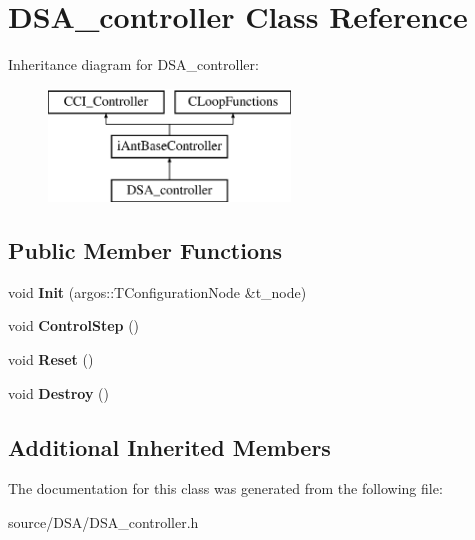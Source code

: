\hypertarget{class_d_s_a__controller}{}\section{D\+S\+A\+\_\+controller Class Reference}
\label{class_d_s_a__controller}
Inheritance diagram for D\+S\+A\+\_\+controller\+:\begin{figure}[H]
\begin{center}
\leavevmode
\includegraphics[height=3.000000cm]{class_d_s_a__controller}
\end{center}
\end{figure}
\subsection*{Public Member Functions}
\begin{DoxyCompactItemize}
\item 
\hypertarget{class_d_s_a__controller_a8891098013a4af1dcf7d5c8778387ff9}{}void {\bfseries Init} (argos\+::\+T\+Configuration\+Node \&t\+\_\+node)\label{class_d_s_a__controller_a8891098013a4af1dcf7d5c8778387ff9}

\item 
\hypertarget{class_d_s_a__controller_a5ac79d0e62322382799e9ad7834e4f4e}{}void {\bfseries Control\+Step} ()\label{class_d_s_a__controller_a5ac79d0e62322382799e9ad7834e4f4e}

\item 
\hypertarget{class_d_s_a__controller_aec7096f6666f694b5498b2d9dc424ff9}{}void {\bfseries Reset} ()\label{class_d_s_a__controller_aec7096f6666f694b5498b2d9dc424ff9}

\item 
\hypertarget{class_d_s_a__controller_a521abb258aba39cc9a3d7170001dfb78}{}void {\bfseries Destroy} ()\label{class_d_s_a__controller_a521abb258aba39cc9a3d7170001dfb78}

\end{DoxyCompactItemize}
\subsection*{Additional Inherited Members}


The documentation for this class was generated from the following file\+:\begin{DoxyCompactItemize}
\item 
source/\+D\+S\+A/D\+S\+A\+\_\+controller.\+h\end{DoxyCompactItemize}
